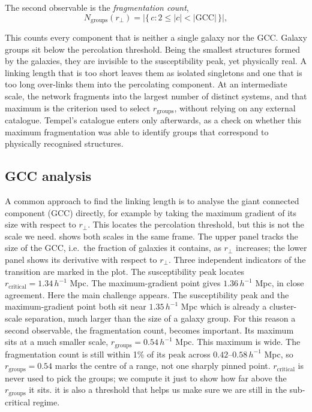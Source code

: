 \documentclass[9pt,a4paper,twocolumn,twoside]{rho-class/rho}
\begin{document}
The second observable is the \emph{fragmentation count},
\begin{equation}\label{eq:nfrag}
    N_{\mathrm{groups}}(r_\perp)
    = \bigl|\{\,c : 2 \le |c| < |\mathrm{GCC}|\,\}\bigr|,
\end{equation}

This counts every component that is neither a single galaxy nor the GCC. Galaxy
groups sit below the percolation threshold. Being the smallest structures formed
by the galaxies, they are invisible to the susceptibility peak, yet physically
real. A linking length that is too short leaves them as isolated singletons and
one that is too long over-links them into the percolating component. At an
intermediate scale, the network fragments into the largest number of distinct
systems, and that maximum is the criterion used to select $r_{\mathrm{groups}}$,
without relying on any external catalogue. Tempel's catalogue enters only
afterwards, as a check on whether this maximum fragmentation was able to
identify groups that correspond to physically recognised structures.

\subsection{GCC analysis}

A common approach to find the linking length is to analyse the giant connected
component (GCC) directly, for example by taking the maximum gradient of its
size with respect to $r_\perp$. This locates the percolation threshold, but
this is not the scale we need.  shows both scales in the same
frame. The upper panel tracks the size of the GCC, i.e.\ the fraction of
galaxies it contains, as $r_\perp$ increases; the lower panel shows its
derivative with respect to $r_\perp$. Three independent indicators of the
transition are marked in the plot. The susceptibility peak locates
$r_{\mathrm{critical}} = 1.34\,h^{-1}$ Mpc. The maximum-gradient point gives
$1.36\,h^{-1}$ Mpc, in close agreement. Here the main challenge appears. The
susceptibility peak and the maximum-gradient point both sit near
$1.35\,h^{-1}$ Mpc which is already a cluster-scale separation, much larger
than the size of a galaxy group. For this reason a second observable, the
fragmentation count, becomes important. Its maximum sits at a much smaller
scale, $r_{\mathrm{groups}} = 0.54\,h^{-1}$ Mpc. This maximum is wide. The
fragmentation count is still within 1\% of its peak across $0.42$--$0.58\,h^{-1}$
Mpc, so $r_{\mathrm{groups}} = 0.54$ marks the centre of a range, not one
sharply pinned point. $r_{\mathrm{critical}}$ is never used to pick the
groups; we compute it just to show how far above the $r_{\mathrm{groups}}$ it
sits. it is also a threshold that helps us make sure we are still in the
sub-critical regime.
\end{document}
